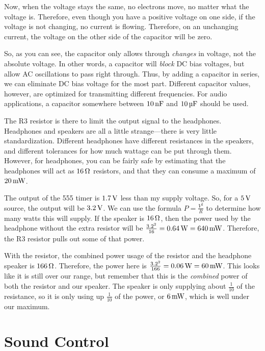 Now, when the voltage stays the same, no electrons move, no matter what the voltage is.
Therefore, even though you have a positive voltage on one side, if the voltage is not changing, no current is flowing.
Therefore, on an unchanging current, the voltage on the other side of the capacitor will be zero.

So, as you can see, the capacitor only allows through \emph{changes} in voltage, not the absolute voltage.
In other words, a capacitor will \emph{block} DC bias voltages, but allow AC oscillations to pass right through.
Thus, by adding a capacitor in series, we can eliminate DC bias voltage for the most part.
Different capacitor values, however, are optimized for transmitting different frequencies.
For audio applications, a capacitor somewhere between $10\,\si{\nano\farad}$ and $10\,\si{\micro\farad}$ should be used.

The R3 resistor is there to limit the output signal to the headphones.
Headphones and speakers are all a little strange---there is very little standardization.
Different headphones have different resistances in the speakers, and different tolerances for how much wattage can be put through them.
However, for headphones, you can be fairly safe by estimating that the headphones will act as $16\,\si{\ohm}$ resistors, and that they can consume a maximum of $20\,\si{\milli\watt}$.

The output of the 555 timer is $1.7\,\si{\volt}$ less than my supply voltage.
So, for a $5\,\si{\volt}$ source, the output will be $3.2\,\si{\volt}$. 
We can use the formula $P = \frac{V^2}{R}$ to determine how many watts this will supply.
If the speaker is $16\,\si{\ohm}$, then the power used by the headphone without the extra resistor will be $\frac{3.2^2}{16} = 0.64\,\si{\watt} = 640\,\si{\milli\watt}$.
Therefore, the R3 resistor pulls out some of that power.

With the resistor, the combined power usage of the resistor and the headphone speaker is $166\,\si{\ohm}$.
Therefore, the power here is $\frac{3.2^2}{166} = 0.06\,\si{\watt} = 60\,\si{\milli\watt}$.
This looks like it is still over our range, but remember that this is the \emph{combined} power of both the resistor and our speaker.
The speaker is only supplying about $\frac{1}{10}$ of the resistance, so it is only using up $\frac{1}{10}$ of the power, or $6\,\si{\milli\watt}$, which is well under our maximum.

\section{Sound Control}

